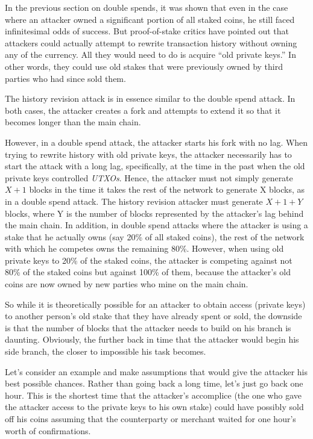 \documentclass[a4paper,11pt]{article}
\begin{document}
In the previous section on double spends, it was shown that even in the case where an attacker owned a significant portion of all staked coins, he still faced infinitesimal odds of success. But proof-of-stake critics have pointed out that attackers could actually attempt to rewrite transaction history without owning any of the currency. All they would need to do is acquire “old private keys.” In other words, they could use old stakes that were previously owned by third parties who had since sold them.

The history revision attack is in essence similar to  the double spend attack. In both cases, the attacker creates a fork and attempts to extend it so that it becomes longer than the main chain.

However, in a double spend attack, the attacker starts his fork with no lag. When trying to rewrite history with old private keys, the attacker necessarily has to start the attack with a long lag, specifically, at the time in the past when the old private keys controlled \textit{UTXOs}. Hence, the attacker must not simply generate $X+1$ blocks in the time it takes the rest of the network to generate X blocks, as in a double spend attack. The history revision attacker must generate $X+1+Y$ blocks, where Y is the number of blocks represented by the attacker's lag behind the main chain. In addition, in double spend attacks where the attacker is using a stake that he actually owns (say 20\% of all staked coins), the rest of the network with which he competes owns the remaining 80\%. However, when using old private keys to 20\% of the staked coins, the attacker is competing against not 80\% of the staked coins but against 100\% of them, because the attacker's old coins are now owned by new parties who mine on the main chain.

So while it is theoretically possible for an attacker to obtain access (private keys) to another person's old stake that they have already spent or sold, the downside is that the number of blocks that the attacker needs to build on his branch is daunting. Obviously, the further back in time that the attacker would begin his side branch, the closer to impossible his task becomes.

Let's consider an example and make assumptions that would give the attacker his best possible chances. Rather than going back a long time, let's just go back one hour. This is the shortest time that the attacker's accomplice (the one who gave the attacker access to the private keys to his own stake) could have possibly sold off his coins assuming that the counterparty or merchant waited for one hour's worth of confirmations.
\end{document}
